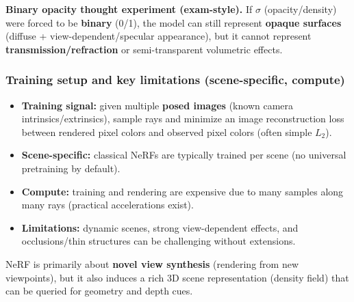 \documentclass[11pt,a4paper]{article}
\begin{document}
\begin{notebox}
\textbf{Binary opacity thought experiment (exam-style).} If $\sigma$ (opacity/density) were forced to be \textbf{binary} (0/1),
the model can still represent \textbf{opaque surfaces} (diffuse + view-dependent/specular appearance),
but it cannot represent \textbf{transmission/refraction} or semi-transparent volumetric effects.
\end{notebox}

\subsubsection{Training setup and key limitations (scene-specific, compute)}
\begin{itemize}
  \item \textbf{Training signal:} given multiple \textbf{posed images} (known camera intrinsics/extrinsics), sample rays and minimize an image reconstruction loss
        between rendered pixel colors and observed pixel colors (often simple $L_2$).
  \item \textbf{Scene-specific:} classical NeRFs are typically trained per scene (no universal pretraining by default).
  \item \textbf{Compute:} training and rendering are expensive due to many samples along many rays (practical accelerations exist).
  \item \textbf{Limitations:} dynamic scenes, strong view-dependent effects, and occlusions/thin structures can be challenging without extensions.
\end{itemize}

\begin{notebox}
NeRF is primarily about \textbf{novel view synthesis} (rendering from new viewpoints), but it also induces a rich
3D scene representation (density field) that can be queried for geometry and depth cues.
\end{notebox}
\end{document}
